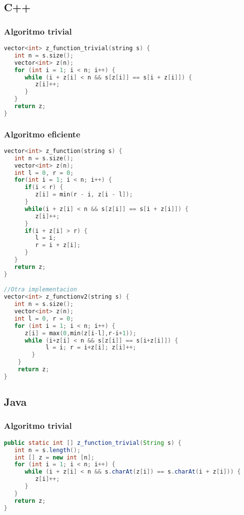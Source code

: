 \subsection{C++}

\subsubsection{Algoritmo trivial}
\begin{lstlisting}[language=C++]
vector<int> z_function_trivial(string s) {
   int n = s.size();
   vector<int> z(n);
   for (int i = 1; i < n; i++) {
      while (i + z[i] < n && s[z[i]] == s[i + z[i]]) {
         z[i]++;
      }
   }
   return z;
}
\end{lstlisting} 

\subsubsection{Algoritmo eficiente}
\begin{lstlisting}[language=C++]
vector<int> z_function(string s) {
   int n = s.size();
   vector<int> z(n);
   int l = 0, r = 0;
   for(int i = 1; i < n; i++) {
      if(i < r) {
         z[i] = min(r - i, z[i - l]);
      }
      while(i + z[i] < n && s[z[i]] == s[i + z[i]]) {
         z[i]++;
      }
      if(i + z[i] > r) {
         l = i;
         r = i + z[i];
      }
   }
   return z;
}

//Otra implementacion
vector<int> z_functionv2(string s) {
   int n = s.size();
   vector<int> z(n);
   int l = 0, r = 0;
   for (int i = 1; i < n; i++) {
      z[i] = max(0,min(z[i-l],r-i+1));
      while (i+z[i] < n && s[z[i]] == s[i+z[i]]) {
			l = i; r = i+z[i]; z[i]++;
		}
	}
	return z;
}	
\end{lstlisting} 

\subsection{Java}

\subsubsection{Algoritmo trivial}
\begin{lstlisting}[language=Java]
public static int [] z_function_trivial(String s) {
   int n = s.length();
   int [] z = new int [n];
   for (int i = 1; i < n; i++) {
      while (i + z[i] < n && s.charAt(z[i]) == s.charAt(i + z[i])) {
         z[i]++;
      }
   }
   return z;
}
\end{lstlisting} 

